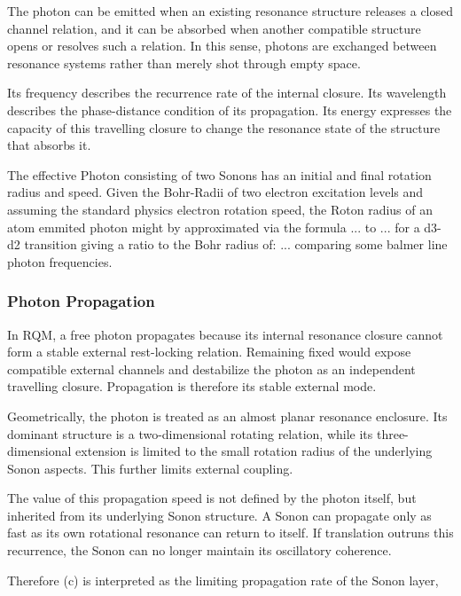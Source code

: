 \documentclass[11pt,a4paper]{article}
\begin{document}
The photon can be emitted when an existing resonance structure releases a closed channel relation, and it can be absorbed when another compatible structure opens or resolves such a relation. In this sense, photons are exchanged between resonance systems rather than merely shot through empty space.

Its frequency describes the recurrence rate of the internal closure. Its wavelength describes the phase-distance condition of its propagation. Its energy expresses the capacity of this travelling closure to change the resonance state of the structure that absorbs it.

The effective Photon consisting of two Sonons has an initial and final rotation radius and speed. Given the Bohr-Radii of two electron excitation levels and assuming the standard physics electron rotation speed, the Roton radius of an atom emmited photon might by approximated via the formula ... to ... for a d3-d2 transition giving a ratio to the Bohr radius of: ... comparing some balmer line photon frequencies.


\subsubsection{Photon Propagation}

In RQM, a free photon propagates because its internal resonance closure cannot form a stable external rest-locking relation. Remaining fixed would expose compatible external channels and destabilize the photon as an independent travelling closure. Propagation is therefore its stable external mode.

Geometrically, the photon is treated as an almost planar resonance enclosure. Its dominant structure is a two-dimensional rotating relation, while its three-dimensional extension is limited to the small rotation radius of the underlying Sonon aspects. This further limits external coupling.

The value of this propagation speed is not defined by the photon itself, but inherited from its underlying Sonon structure. A Sonon can propagate only as fast as its own rotational resonance can return to itself. If translation outruns this recurrence, the Sonon can no longer maintain its oscillatory coherence.

Therefore (c) is interpreted as the limiting propagation rate of the Sonon layer,
\end{document}
